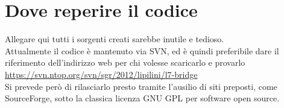 \chapter{Dove reperire il codice}

Allegare qui tutti i sorgenti creati sarebbe inutile e tedioso.\\

Attualmente il codice è mantenuto via SVN, ed è quindi preferibile dare il riferimento dell'indirizzo web per chi volesse scaricarlo e provarlo\\

\url{https://svn.ntop.org/svn/sgr/2012/lipilini/l7-bridge}\\

Si prevede però di rilasciarlo presto tramite l'ausilio di siti preposti, come \mbox{SourceForge}, sotto la classica licenza GNU GPL per software open source.